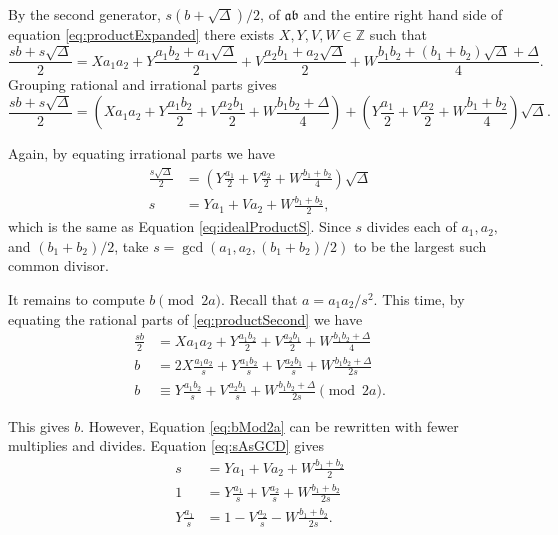 \documentclass{ucalgthes1}
\theoremstyle{definition}
\newcommand{\ZZ}{\mathbb{Z}}
\begin{document}
By the second generator, $s(b+\sqrt\Delta)/2$, of $\mathfrak{a}\mathfrak{b}$ and the entire right hand side of equation \eqref{eq:productExpanded} there exists $X, Y, V, W \in \ZZ$ such that
\[
\frac{sb+s\sqrt\Delta}{2} = Xa_1a_2 + Y\frac{a_1b_2+a_1\sqrt\Delta}{2} + V\frac{a_2b_1 + a_2\sqrt{\Delta}}{2} + W\frac{b_1b_2 + (b_1+b_2)\sqrt{\Delta} + \Delta}{4}.
\]
Grouping rational and irrational parts gives
\begin{equation}
\label{eq:productSecond}
\frac{sb+s\sqrt\Delta}{2} = \left( Xa_1a_2 + Y\frac{a_1b_2}{2} + V\frac{a_2b_1}{2} + W\frac{b_1b_2 + \Delta}{4} \right) + \left(Y\frac{a_1}{2} + V\frac{a_2}{2} + W\frac{b_1+b_2}{4}\right)\sqrt\Delta. 
\end{equation}

\noindent
Again, by equating irrational parts we have
\begin{align}
	\frac{s\sqrt\Delta}{2} & = \left(Y\frac{a_1}{2} + V\frac{a_2}{2} + W\frac{b_1+b_2}{4}\right)\sqrt\Delta \nonumber \\
	s & = Ya_1 + Va_2 + W\frac{b_1+b_2}{2}, \label{eq:sAsGCD}
\end{align}
which is the same as Equation \ref{eq:idealProductS}.  Since $s$ divides each of $a_1, a_2,$ and $(b_1+b_2)/2$, take $s = \gcd(a_1, a_2, (b_1+b_2)/2)$ to be the largest such common divisor.

It remains to compute $b \pmod{2a}$.  Recall that $a = a_1a_2/s^2$.  This time, by equating the rational parts of \eqref{eq:productSecond} we have
\begin{align}
	\frac{sb}{2} & = Xa_1a_2 + Y\frac{a_1b_2}{2} + V\frac{a_2b_1}{2} + W\frac{b_1b_2 + \Delta}{4} \nonumber \\
	b & = 2X\frac{a_1a_2}{s} + Y\frac{a_1b_2}{s} + V\frac{a_2b_1}{s} + W\frac{b_1b_2 + \Delta}{2s} \nonumber \\
	b & \equiv Y\frac{a_1b_2}{s} + V\frac{a_2b_1}{s} + W\frac{b_1b_2 + \Delta}{2s} \pmod{2a}. \label{eq:bMod2a}
\end{align}

\noindent
This gives $b$.  However, Equation \eqref{eq:bMod2a} can be rewritten with fewer multiplies and divides.  Equation \eqref{eq:sAsGCD} gives
\begin{align*}
	s & = Ya_1 + Va_2 + W\frac{b_1+b_2}{2} \\
	1 & = Y\frac{a_1}{s} + V\frac{a_2}{s} + W\frac{b_1+b_2}{2s} \\
	Y\frac{a_1}{s} & = 1 - V\frac{a_2}{s} - W\frac{b_1+b_2}{2s}.
\end{align*}
\end{document}
